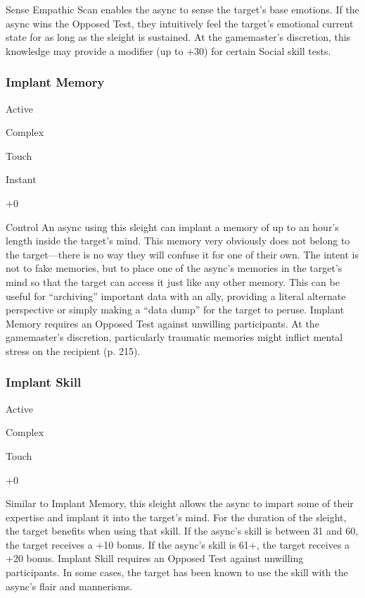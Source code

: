 Sense
Empathic Scan enables the async to sense the target's 
base emotions. If the async wins the Opposed Test, 
they intuitively feel the target's emotional current state 
for as long as the sleight is sustained. At the gamemaster's
discretion, this knowledge may provide a modifier
(up to +30) for certain Social skill tests.

\subsubsection{Implant Memory}


  

Active

   Complex

 Touch

   Instant

   +0

  

Control
An async using this sleight can implant a memory 
of up to an hour's length inside the target's mind. 
This memory very obviously does not belong to the 
target—there is no way they will confuse it for one 
of their own. The intent is not to fake memories, but 
to place one of the async's memories in the target's 
mind so that the target can access it just like any other 
memory. This can be useful for ``archiving'' important 
data with an ally, providing a literal alternate perspective
or simply making a ``data dump'' for the target
to peruse. Implant Memory requires an Opposed Test 
against unwilling participants. At the gamemaster's 
discretion, particularly traumatic memories might 
inflict mental stress on the recipient (p. 215).

\subsubsection{Implant Skill}


  

Active

   Complex

 Touch

  

   +0

  
Similar to Implant Memory, this sleight allows the 
async to impart some of their expertise and implant it 
into the target's mind. For the duration of the sleight, 
the target benefits when using that skill. If the async's 
skill is between 31 and 60, the target receives a +10 
bonus. If the async's skill is 61+, the target receives 
a +20 bonus. Implant Skill requires an Opposed Test 
against unwilling participants. In some cases, the 
target has been known to use the skill with the async's 
flair and mannerisms.

